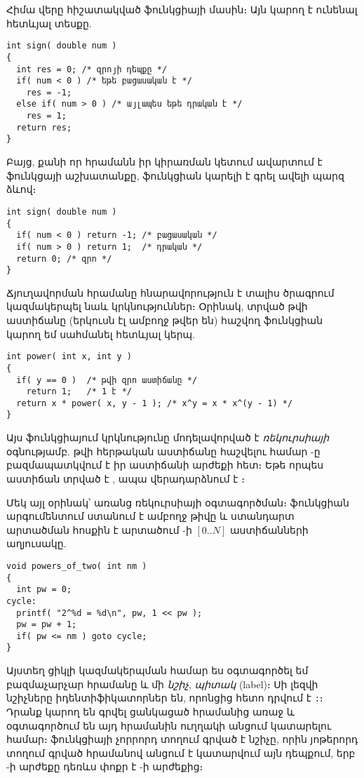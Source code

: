Հիմա վերը հիշատակված  ֆունկցիայի մասին։ Այն կարող է ունենալ
հետևյալ տեսքը.

\begin{Verbatim}
int sign( double num )
{
  int res = 0; /* զրոյի դեպքը */
  if( num < 0 ) /* եթե բացասական է */
    res = -1;
  else if( num > 0 ) /* այլապես եթե դրական է */
    res = 1;
  return res;
}
\end{Verbatim}

Բայց, քանի որ  հրամանն իր կիրառման կետում ավարտում է ֆունկցայի
աշխատանքը,  ֆունկցիան կարելի է գրել ավելի պարզ ձևով։

\begin{Verbatim}
int sign( double num )
{
  if( num < 0 ) return -1; /* բացասական */
  if( num > 0 ) return 1;  /* դրական */
  return 0; /* զրո */
}
\end{Verbatim}

Ճյուղավորման հրամանը հնարավորություն է տալիս ծրագրում կազմակերպել նաև
կրկնություններ։ Օրինակ, տրված  թվի  աստիճանը (երկուսն
էլ ամբողջ թվեր են) հաշվող ֆունկցիան կարող եմ սահմանել հետևյալ կերպ.

\begin{Verbatim}
int power( int x, int y )
{
  if( y == 0 )  /* թվի զրո աստիճանը */
    return 1;   /* 1 է */
  return x * power( x, y - 1 ); /* x^y = x * x^(y - 1) */
}
\end{Verbatim}

Այս ֆունկցիայում կրկնությունը մոդելավորված է \emph{ռեկուրսիայի}
 օգնությամբ.  թվի հերթական  աստիճանը
հաշվելու համար -ը բազմապատկվում է իր  աստիճանի արժեքի
հետ։ Եթե որպես աստիճան տրված է , ապա վերադարձնում է ։

Մեկ այլ օրինակ՝ առանց ռեկուրսիայի օգտագործման։ 
ֆունկցիան արգումենտում ստանում է  ամբողջ թիվը և ստանդարտ արտածման
հոսքին է արտածում -ի \([0..N]\) աստիճանների աղյուսակը.

\begin{Verbatim}
void powers_of_two( int nm )
{
  int pw = 0;
cycle:
  printf( "2^%d = %d\n", pw, 1 << pw );
  pw = pw + 1;
  if( pw <= nm ) goto cycle;
}
\end{Verbatim}

Այստեղ ցիկլի կազմակերպման համար ես օգտագործել եմ բազմաչարչար 
 հրամանը և մի \emph{նշիչ}, \emph{պիտակ} (label)։ Սի լեզվի
նշիչները իդենտիֆիկատորներ են, որոնցից հետո դրվում է \verb|:|։ Դրանք կարող
են գրվել ցանկացած հրամանից առաջ և օգտագործում են այդ հրամանին ուղղակի անցում
կատարելու համար։  ֆունկցիայի չորրորդ տողում գրված
է  նշիչը, որին յոթերորդ տողում գրված  հրամանով
անցում է կատարվում այն դեպքում, երբ -ի արժեքը դեռևս փոքր է
-ի արժեքից։

